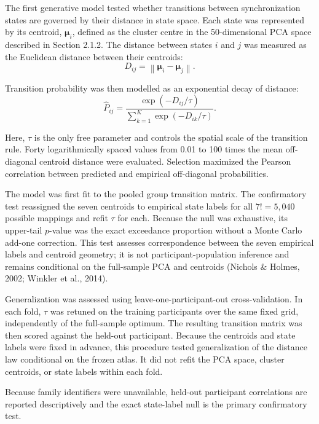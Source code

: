 \documentclass[12pt,a4paper]{report}
\begin{document}
The first generative model tested whether transitions between synchronization states are governed by their distance in state space. Each state was represented by its centroid, $\boldsymbol{\mu}_i$, defined as the cluster centre in the 50-dimensional PCA space described in Section 2.1.2. The distance between states $i$ and $j$ was measured as the Euclidean distance between their centroids:
\begin{equation}
D_{ij}
=
\left\lVert \boldsymbol{\mu}_i - \boldsymbol{\mu}_j \right\rVert .
\end{equation}

Transition probability was then modelled as an exponential decay of distance:
\begin{equation}
\hat{P}_{ij}
=
\frac{\exp(-D_{ij}/\tau)}
{\sum_{k=1}^{K}\exp(-D_{ik}/\tau)} .
\end{equation}

Here, $\tau$ is the only free parameter and controls the spatial scale of the transition rule. Forty logarithmically spaced values from 0.01 to 100 times the mean off-diagonal centroid distance were evaluated. Selection maximized the Pearson correlation between predicted and empirical off-diagonal probabilities.

The model was first fit to the pooled group transition matrix. The confirmatory test reassigned the seven centroids to empirical state labels for all $7!=5{,}040$ possible mappings and refit $\tau$ for each. Because the null was exhaustive, its upper-tail $p$-value was the exact exceedance proportion without a Monte Carlo add-one correction. This test assesses correspondence between the seven empirical labels and centroid geometry; it is not participant-population inference and remains conditional on the full-sample PCA and centroids (Nichols \& Holmes, 2002; Winkler et al., 2014).

Generalization was assessed using leave-one-participant-out cross-validation. In each fold, $\tau$ was retuned on the training participants over the same fixed grid, independently of the full-sample optimum. The resulting transition matrix was then scored against the held-out participant. Because the centroids and state labels were fixed in advance, this procedure tested generalization of the distance law conditional on the frozen atlas. It did not refit the PCA space, cluster centroids, or state labels within each fold.

Because family identifiers were unavailable, held-out participant correlations are reported descriptively and the exact state-label null is the primary confirmatory test.
\end{document}
